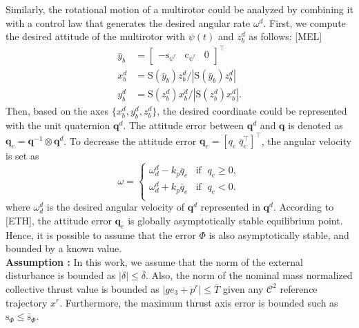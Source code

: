 \documentclass[letterpaper, 10 pt, conference]{ieeeconf}  %
\begin{document}
Similarly, the rotational motion of a multirotor could be analyzed by combining it with a control law that generates the desired angular rate $\omega^d$. 
First, we compute the desired attitude of the multirotor with $\psi(t)$ and $z_b^d$ as follows: [MEL]
\begin{align}
\bar{y}_b &= [\begin{array}{ccc}-\text{s}_{\psi^r}&\text{c}_{\psi^r}&0\end{array}]^\top \nonumber \\
x_b^d &= \text{S}(\bar{y}_b)z_b^d / |\text{S}(\bar{y}_b)z_b^d | \nonumber \\ 
y_b^d &= \text{S}({z}_b^d)x_b^d / |\text{S}(z_b^d)x_b^d |. \nonumber  
\end{align}
Then, based on the axes $\{x_b^d,y_b^d,z_b^d\}$, the desired coordinate could be represented with the unit quaternion $\textbf{q}^d$. 
The attitude error between $\textbf{q}^d$ and $\textbf{q}$ is denoted as $\textbf{q}_e = \textbf{q}^{-1}\otimes \textbf{q}^d$. To decrease the attitude error $\textbf{q}_e = [q_e\;\bar{q}_e^\top]^\top$, the angular velocity is set as 
\begin{equation}
\omega = \left\{
\begin{array}{ll}
\omega_d^d - k_p \bar{q}_e & \text{if  }\;q_e \geq 0, \\ 
\omega_d^d + k_p \bar{q}_e & \text{if  }\;q_e < 0. \\ 
\end{array}
\right.
\end{equation}
where $\omega_d^d$ is the desired angular velocity of $\textbf{q}^d$ represented in $\textbf{q}^d$.
According to [ETH], the attitude error $\textbf{q}_e$ is globally asymptotically stable equilibrium point. 
Hence, it is possible to assume that the error $\Phi$ is also asymptotically stable, and bounded by a known value.
\\
\textbf{Assumption : }
In this work, we assume that the norm of the external disturbance is bounded as $|\delta| \leq \bar{\delta}$. 
Also, the norm of the nominal mass normalized collective thrust value is bounded as $|ge_3 + \ddot{p}^r| \leq \bar{T}$ given any $\mathcal{C}^2$ reference trajectory $x^r$.  
Furthermore, the maximum thrust axis error is bounded such as $\text{s}_\Phi \leq \bar{\text{s}}_\Phi$.
\end{document}
